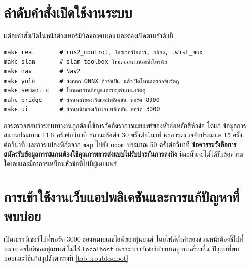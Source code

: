 \documentclass[a4paper,12pt]{report}
\begin{document}
\section{ลำดับคำสั่งเปิดใช้งานระบบ}

แต่ละคำสั่งเปิดในหน้าต่างเทอร์มินัลของตนเอง และต้องเปิดตามลำดับนี้

{\small
\begin{verbatim}
make real       # ros2_control, ไดรเวอร์ไลดาร์, กล้อง, twist_mux
make slam       # slam_toolbox โหมดออนไลน์อะซิงโครนัส
make nav        # Nav2
make yolo       # ส่งออก ONNX ถ้าจำเป็น แล้วเปิดโหนดตรวจจับวัตถุ
make semantic   # โหนดผสานข้อมูลและระบุตำแหน่งวัตถุ
make bridge     # ส่วนหลังของเว็บแอปพลิเคชัน พอร์ต 8000
make ui         # ส่วนหน้าของเว็บแอปพลิเคชัน พอร์ต 3000
\end{verbatim}
}

การตรวจสอบว่าระบบทำงานถูกต้องใช้การวัดอัตราการเผยแพร่ของหัวข้อหลักสี่หัวข้อ
ได้แก่ ข้อมูลการสแกนประมาณ 11.6 ครั้งต่อวินาที
สถานะข้อต่อ 30 ครั้งต่อวินาที ผลการตรวจจับประมาณ 15 ครั้งต่อวินาที
และการแปลงพิกัดจาก \texttt{map} ไปยัง \texttt{odom} ประมาณ 50 ครั้งต่อวินาที
\textbf{ข้อควรระวังคือการสมัครรับข้อมูลการสแกนต้องใช้คุณภาพการส่งแบบไม่รับประกันการส่งถึง}
มิฉะนั้นจะไม่ได้รับข้อความใดเลยและมีอาการเหมือนหัวข้อที่ไม่มีผู้เผยแพร่

\section{การเข้าใช้งานเว็บแอปพลิเคชันและการแก้ปัญหาที่พบบ่อย}

เปิดเบราว์เซอร์ไปที่พอร์ต 3000 ของหมายเลขไอพีของหุ่นยนต์
โดยไฟล์ตั้งค่าของส่วนหน้าต้องชี้ไปที่หมายเลขไอพีของหุ่นยนต์ ไม่ใช่ \texttt{localhost}
เพราะเบราว์เซอร์ทำงานอยู่บนเครื่องอื่น
ปัญหาที่พบบ่อยและวิธีแก้สรุปดังตารางที่ \ref{tab:troubleshoot}
\end{document}
